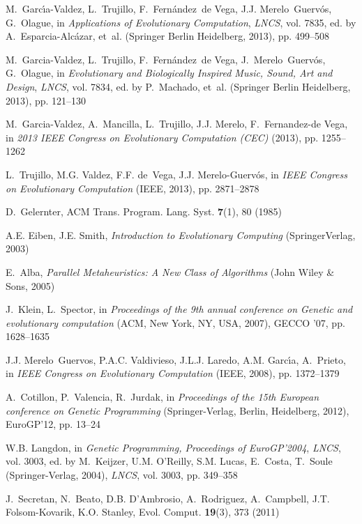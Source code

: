 \begin{thebibliography}{10}
M.~Garc{\'\i}a-Valdez, L.~Trujillo, F.~Fern{\'a}ndez~de Vega, J.J.
  Merelo~Guerv\'os, G.~Olague, in \emph{Applications of Evolutionary
  Computation}, \emph{LNCS}, vol. 7835, ed. by A.~Esparcia-Alc{\'a}zar, et~al.
  (Springer Berlin Heidelberg, 2013), pp. 499--508

M.~Garcia-Valdez, L.~Trujillo, F.~Fern{\'a}ndez~de Vega, J.~Merelo~Guerv{\'o}s,
  G.~Olague, in \emph{Evolutionary and Biologically Inspired Music, Sound, Art
  and Design}, \emph{LNCS}, vol. 7834, ed. by P.~Machado, et~al. (Springer
  Berlin Heidelberg, 2013), pp. 121--130

M.~Garcia-Valdez, A.~Mancilla, L.~Trujillo, J.J. Merelo, F.~Fernandez-de Vega,
  in \emph{2013 IEEE Congress on Evolutionary Computation (CEC)} (2013), pp.
  1255--1262

L.~Trujillo, M.G. Valdez, F.F. de~Vega, J.J. Merelo-Guerv\'os, in \emph{IEEE
  Congress on Evolutionary Computation} (IEEE, 2013), pp. 2871--2878

D.~Gelernter, ACM Trans. Program. Lang. Syst. \textbf{7}(1), 80 (1985)

A.E. Eiben, J.E. Smith, \emph{Introduction to Evolutionary Computing}
  (SpringerVerlag, 2003)

E.~Alba, \emph{Parallel Metaheuristics: {A} New Class of Algorithms} (John
  Wiley \& Sons, 2005)

J.~Klein, L.~Spector, in \emph{Proceedings of the 9th annual conference on
  Genetic and evolutionary computation} (ACM, New York, NY, USA, 2007), GECCO
  '07, pp. 1628--1635

J.J. Merelo~Guervos, P.A.C. Valdivieso, J.L.J. Laredo, A.M. Garc{\'\i}a,
  A.~Prieto, in \emph{IEEE Congress on Evolutionary Computation} (IEEE, 2008),
  pp. 1372--1379

A.~Cotillon, P.~Valencia, R.~Jurdak, in \emph{Proceedings of the 15th European
  conference on Genetic Programming} (Springer-Verlag, Berlin, Heidelberg,
  2012), EuroGP'12, pp. 13--24

W.B. Langdon, in \emph{Genetic Programming, Proceedings of EuroGP'2004},
  \emph{LNCS}, vol. 3003, ed. by M.~Keijzer, U.M. O'Reilly, S.M. Lucas,
  E.~Costa, T.~Soule (Springer-Verlag, 2004), \emph{LNCS}, vol. 3003, pp.
  349--358

J.~Secretan, N.~Beato, D.B. D'Ambrosio, A.~Rodriguez, A.~Campbell, J.T.
  Folsom-Kovarik, K.O. Stanley, Evol. Comput. \textbf{19}(3), 373 (2011)


\end{thebibliography}
